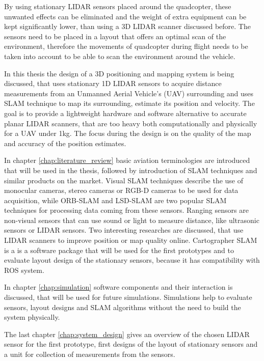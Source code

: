 By using stationary LIDAR sensors placed around the quadcopter, these unwanted effects can be eliminated and the weight of 
extra equipment can be kept significantly lower, than using a 3D LIDAR scanner discussed before. The sensors need to be placed
in a layout that offers an optimal scan of the environment, therefore the movements of quadcopter during flight needs to be 
taken into account to be able to scan the environment around the vehicle.

In this thesis the design of a 3D positioning and mapping system is being discussed, that uses stationary 1D LIDAR sensors to 
acquire distance measurements from an Unmanned Aerial Vehicle's (UAV) surrounding and uses SLAM technique to map its 
surrounding, estimate its position and velocity. The goal is to provide a lightweight hardware and software alternative to 
accurate planar LIDAR scanners, that are too heavy both computationally and physically for a UAV under 1kg. The focus during 
the design is on the quality of the map and accuracy of the position estimates.

In chapter \ref{chap:literature_review} basic aviation terminologies are introduced that will be used in the thesis, followed
by introduction of SLAM techniques and similar products on the market. Visual SLAM techniques describe the use of monocular 
cameras, stereo cameras or RGB-D cameras to be used for data acquisition, while ORB-SLAM and LSD-SLAM are two popular SLAM
techniques for processing data coming from these sensors. Ranging sensors are non-visual sensors that can use sound
or light to measure distance, like ultrasonic sensors or LIDAR sensors. Two interesting researches are discussed, that use 
LIDAR scanners to improve position or map quality online. Cartographer SLAM is a is a software package that will be used
for the first prototypes and to evaluate layout design of the stationary sensors, because it has compatibility with ROS
system.

In chapter \ref{chap:simulation} software components and their interaction is discussed, that will be used for future 
simulations. Simulations help to evaluate sensors, layout designs and SLAM algorithms without the need to build the system
physically.

The last chapter \ref{chap:system_design} gives an overview of the chosen LIDAR sensor for the first prototype, first designs 
of the layout of stationary sensors and a unit for collection of measurements from the sensors.